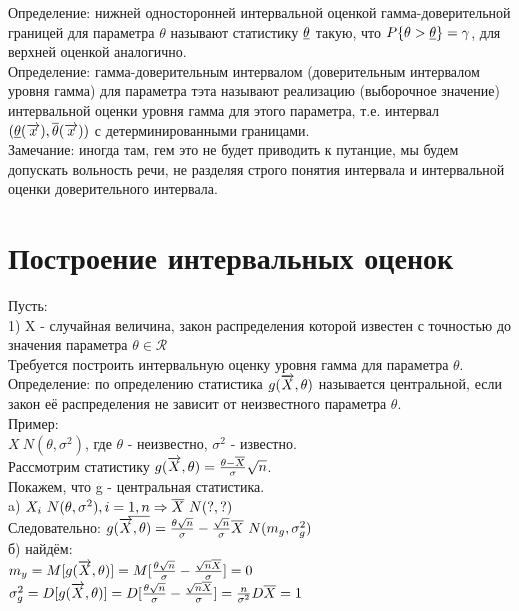 Определение: нижней односторонней интервальной оценкой гамма-доверительной границей для параметра $\theta$ называют статистику $\underline{\theta}$ такую, что $P\{\theta > \underline{\theta}\} = \gamma$, для верхней оценкой аналогично.\\


Определение: гамма-доверительным интервалом (доверительным интервалом уровня гамма) для параметра тэта называют реализацию (выборочное значение) интервальной оценки уровня гамма для этого параметра, т.е. интервал $(\underline{\theta}(\overrightarrow{x}), \overline{\theta}(\overrightarrow{x}))$ с детерминированными границами.\\

Замечание: иногда там, гем это не будет приводить к путанцие, мы будем допускать вольность речи, не разделяя строго понятия интервала и интервальной оценки доверительного интервала.

\section{Построение интервальных оценок}

Пусть:\\
1) X - случайная величина, закон распределения которой известен с точностью до значения параметра $\theta \in \mathcal{R}$\\
Требуется построить интервальную оценку уровня гамма для параметра $\theta$.\\

Определение: по определению статистика $g(\overrightarrow{X}, \theta)$ называется центральной, если закон её распределения не зависит от неизвестного параметра $\theta$.\\

Пример:\\
$X ~ N(\theta, \sigma^2)$, где $\theta$ - неизвестно, $\sigma^2$ - известно.\\

Рассмотрим  статистику $g(\overrightarrow{X}, \theta) = \frac{\theta - \overline{X}}{\sigma}\sqrt{n}$.\\

Покажем, что g - центральная статистика.\\
a) $X_i ~ N(\theta, \sigma^2), i = \underline{1, n} \Rightarrow \overline{X} ~ N(?, ?)$\\
Следовательно: $g(\overrightarrow{X}, \theta) = \frac{\theta \sqrt{n}}{\sigma} - \frac{\sqrt{n}}{\sigma} \overline{X} ~ N(m_g, \sigma^2_g)$\\
б) найдём:\\
$m_y = M[g(\overrightarrow{X}, \theta)] = M[\frac{\theta \sqrt{n}}{\sigma} - \frac{\sqrt{n} \overline{X}}{\sigma}] = 0$\\
$\sigma^2_g = D[g(\overrightarrow{X}, \theta)] = D[\frac{\theta \sqrt{n}}{\sigma} - \frac{\sqrt{n} \overline{X}}{\sigma}] = \frac{n}{\sigma^2}D\overline{X} = 1$\\

